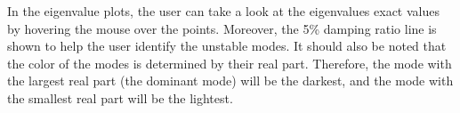In the eigenvalue plots, the user can take a look at the eigenvalues exact values
by hovering the mouse over the points. Moreover, the 5\% damping ratio line is shown to help the user identify
the unstable modes. It should also be noted that the color of the modes is determined by their real part.
 Therefore, the mode with the largest real part (the dominant mode) will be the darkest, 
 and the mode with the smallest real part will be the lightest.








